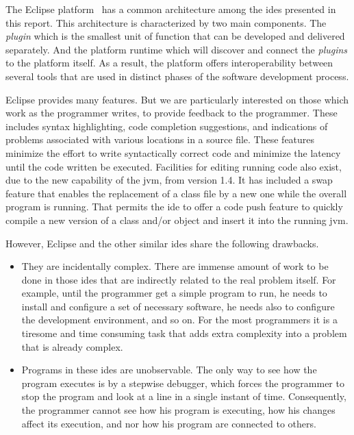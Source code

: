 The Eclipse platform~\cite{DesRivieres2004} has a common architecture among the \ac{ide}s presented in this report. This architecture is characterized by two main components. The \textit{plugin} which is the smallest unit of function that can be developed and delivered separately. And the platform runtime which will discover and connect the \textit{plugins} to the platform itself. As a result, the platform offers interoperability between several tools that are used in distinct phases of the software development process.

Eclipse provides many features. But we are particularly interested on those which work as the programmer writes, to provide feedback to the programmer. These includes syntax highlighting, code completion suggestions, and indications of problems associated with various locations in a source file. These features minimize the effort to write syntactically correct code and minimize the latency until the code written be executed. Facilities for editing running code also exist, due to the new capability of the \ac{jvm}, from version 1.4. It has included a swap feature that enables the replacement of a class file by a new one while the overall program is running. That permits the \ac{ide} to offer a code push feature to quickly compile a new version of a class and/or object and insert it into the running \ac{jvm}.

However, Eclipse and the other similar \ac{ide}s share the following drawbacks.
\begin{itemize}
	\item They are incidentally complex. There are immense amount of work to be done in those \ac{ide}s that are indirectly related to the real problem itself. For example, until the programmer get a simple program to run, he needs to install and configure a set of necessary software, he needs also to configure the development environment, and so on. For the most programmers it is a tiresome and time consuming task that adds extra complexity into a problem that is already complex.
	\item Programs in these \ac{ide}s are unobservable. The only way to see how the program executes is by a stepwise debugger, which forces the programmer to stop the program and look at a line in a single instant of time. Consequently, the programmer cannot see how his program is executing, how his changes affect its execution, and nor how his program are connected to others.
\end{itemize}
